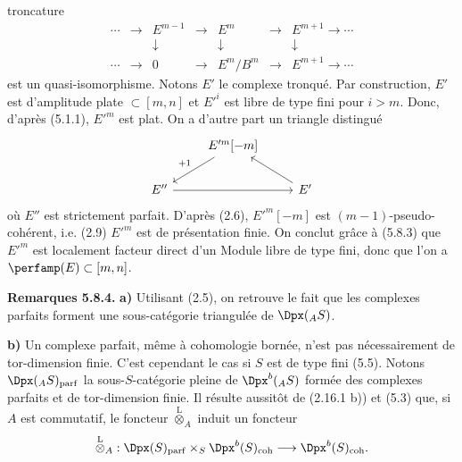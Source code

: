 troncature
\[
\begin{array}{ccccccc}
\cdots&\to&E^{m-1}&\to&E^m&\to&E^{m+1}\to\cdots\\
&&\downarrow&&\downarrow&&\downarrow\\
\cdots&\to&0&\to&E^m/B^m&\to&E^{m+1}\to\cdots
\end{array}
\]
est un quasi-isomorphisme. Notons \(E'\) le complexe tronqué. Par construction, \(E'\) est d'amplitude plate \(\subset[m,n]\) et \(E'^i\) est libre de type fini pour \(i>m\). Donc, d'après (5.1.1), \(E'^m\) est plat. On a d'autre part un triangle distingué
\[
\begin{tikzcd}
& E'^m[-m] \arrow[dl,"+1"'] & \\
E'' \arrow[rr] && E' \arrow[ul]
\end{tikzcd}
\]
où \(E''\) est strictement parfait. D'après (2.6), \(E'^m[-m]\) est \((m-1)\)-pseudo-cohérent, i.e. (2.9) \(E'^m\) est de présentation finie. On conclut grâce à (5.8.3) que \(E'^m\) est localement facteur direct d'un Module libre de type fini, donc que l'on a \(\perfamp(E)\subset[m,n]\).

\textbf{Remarques 5.8.4.} \textbf{a)} Utilisant (2.5), on retrouve le fait que les complexes parfaits forment une sous-catégorie triangulée de \(\Dpx({}_A S)\).

\textbf{b)} Un complexe parfait, même à cohomologie bornée, n'est pas nécessairement de tor-dimension finie. C'est cependant le cas si \(S\) est de type fini (5.5). Notons \(\Dpx({}_A S)_{\mathrm{parf}}\) la sous-\(S\)-catégorie pleine de \(\Dpx^b({}_A S)\) formée des complexes parfaits et de tor-dimension finie. Il résulte aussitôt de (2.16.1 b)) et (5.3) que, si \(A\) est commutatif, le foncteur \(\overset{\mathrm L}{\otimes}_A\) induit un foncteur
\[
  \overset{\mathrm L}{\otimes}_A:
  \Dpx(S)_{\mathrm{parf}}\times_S \Dpx^b(S)_{\mathrm{coh}}
  \longrightarrow \Dpx^b(S)_{\mathrm{coh}}.
\]
